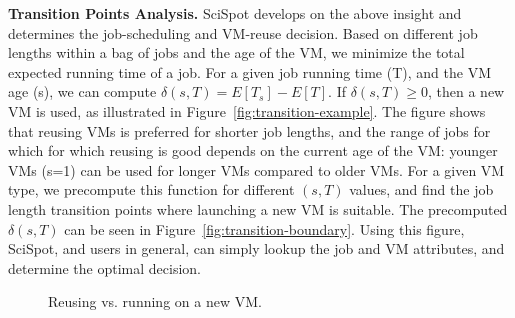 \noindent \textbf{Transition Points Analysis.}
SciSpot develops on the above insight and determines the job-scheduling and VM-reuse decision.
Based on different job lengths within a bag of jobs and the age of the VM, we minimize the total expected running time of a job.
For a given job running time (T), and the VM age (s), we can compute  $\delta(s,T) = E[T_s] - E[T]$.
If $\delta(s,T) \geq 0$, then a new VM is used, as illustrated in Figure~\ref{fig:transition-example}.
The figure shows that reusing VMs is preferred for shorter job lengths, and the range of jobs for which for which reusing is good depends on the current age of the VM: younger VMs (s=1) can be used for longer VMs compared to older VMs. 
For a given VM type, we precompute this function for different $(s, T)$ values, and find the job length transition points where launching a new VM is suitable. 
The precomputed $\delta(s,T)$ can be seen in Figure~\ref{fig:transition-boundary}.
Using this figure, SciSpot, and users in general, can simply lookup the job and VM attributes, and determine the optimal decision. 




\begin{figure}[t]
  \hfill
  \label{fig:transition-all}
  \caption{Reusing vs. running on a new VM.}
\end{figure}


